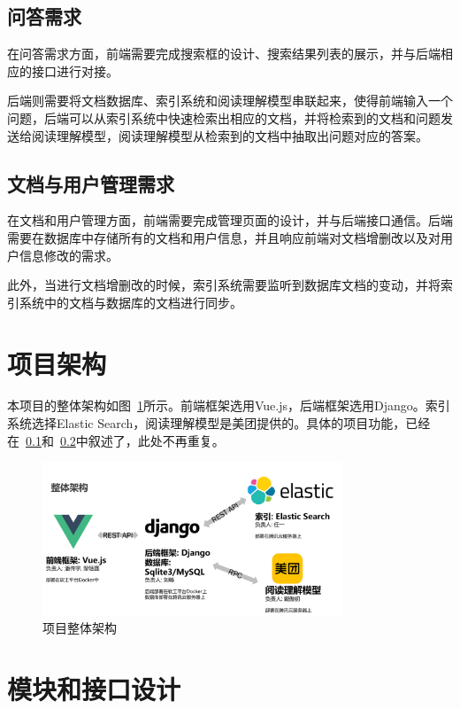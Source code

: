 \documentclass[12pt]{article}
\begin{document}
\subsection{问答需求}
\label{sec:req1}
在问答需求方面，前端需要完成搜索框的设计、搜索结果列表的展示，并与后端相应的接口进行对接。

后端则需要将文档数据库、索引系统和阅读理解模型串联起来，使得前端输入一个问题，后端可以从索引系统中快速检索出相应的文档，并将检索到的文档和问题发送给阅读理解模型，阅读理解模型从检索到的文档中抽取出问题对应的答案。

\subsection{文档与用户管理需求}
\label{sec:req2}
在文档和用户管理方面，前端需要完成管理页面的设计，并与后端接口通信。后端需要在数据库中存储所有的文档和用户信息，并且响应前端对文档增删改以及对用户信息修改的需求。

此外，当进行文档增删改的时候，索引系统需要监听到数据库文档的变动，并将索引系统中的文档与数据库的文档进行同步。

\section{项目架构}  %
本项目的整体架构如图~\ref{fig:structure}所示。前端框架选用Vue.js，后端框架选用Django。索引系统选择Elastic Search，阅读理解模型是美团提供的。具体的项目功能，已经在~\ref{sec:req1}和~\ref{sec:req2}中叙述了，此处不再重复。

\begin{figure}[htbp]  %
    \centering  %
    \includegraphics[width=0.8\textwidth]{fig/structure.png}  %
    \caption{项目整体架构}  %
    \label{fig:structure}  %
\end{figure}
    

\section{模块和接口设计}
\end{document}
